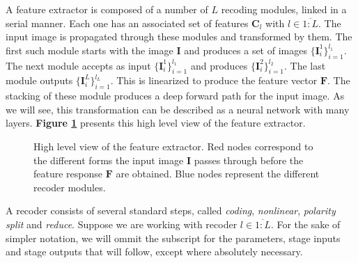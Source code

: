 \documentclass[12pt,a4paper,oneside,english]{UPBThesis}
\newcommand{\hcrange}[2]{\overline{{#1}\colon\!\!{#2}}}
\begin{document}
A feature extractor is composed of a number of $L$ recoding modules, linked in a serial manner. Each one has an associated set of features $\textbf{C}_l$ with $l \in \hcrange{1}{L}$. The input image is propagated through these modules and transformed by them. The first such module starts with the image $\textbf{I}$ and produces a set of images $\{\textbf{I}_i^1\}_{i=1}^{l_1}$. The next module accepts as input $\{\textbf{I}_i^1\}_{i=1}^{l_1}$ and produces $\{\textbf{I}_i^2\}_{i=1}^{l_2}$. The last module outputs $\{\textbf{I}_i^L\}_{i=1}^{l_L}$. This is linearized to produce the feature vector $\mathbf{F}$. The stacking of these module produces a deep forward path for the input image. As we will see, this transformation can be described as a neural network with many layers. \textbf{Figure \ref{fig:OverviewExHighLevelExtractor}} presents this high level view of the feature extractor.

\begin{figure}
\centering
{}
\caption{High level view of the feature extractor. Red nodes correspond to the different forms the input image $\textbf{I}$ passes through before the feature response $\textbf{F}$ are obtained. Blue nodes represent the different recoder modules.}
\label{fig:OverviewExHighLevelExtractor}
\end{figure}

A recoder consists of several standard steps, called \emph{coding}, \emph{nonlinear}, \emph{polarity split} and \emph{reduce}. Suppose we are working with recoder $l \in \hcrange{1}{L}$. For the sake of simpler notation, we will ommit the subscript for the parameters, stage inputs and stage outputs that will follow, except where absolutely necessary.
\end{document}
